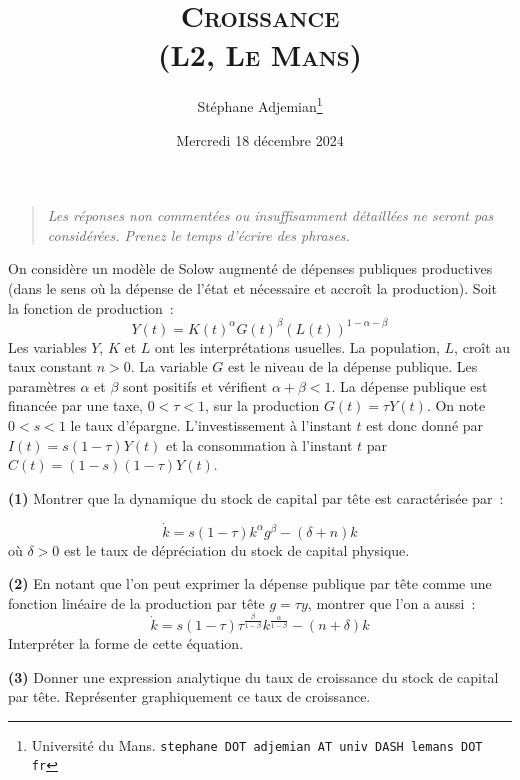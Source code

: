\documentclass[10pt,a4paper,notitlepage,twocolumn]{article}
\newcommand{\question}[1]{\textbf{(#1)}}
\begin{document}
\title{\textsc{Croissance\\ \small{(L2, Le Mans)}}}
\author{Stéphane Adjemian\thanks{Université du Mans. \texttt{stephane
DOT adjemian AT univ DASH lemans DOT fr}}}
\date{Mercredi 18 décembre 2024}

\maketitle

\thispagestyle{empty}

\begin{quote}
  \textit{Les réponses non commentées ou insuffisamment détaillées ne
  seront pas considérées. Prenez le temps d'écrire des phrases.}
\end{quote}

\bigskip
\bigskip

On considère un modèle de Solow augmenté de dépenses publiques
productives (dans le sens où la dépense de l'état et nécessaire et
accroît la production). Soit la fonction de production~:
\[
Y(t) = K(t)^{\alpha}G(t)^{\beta}(L(t))^{1-\alpha-\beta}
\]
Les variables $Y$, $K$ et $L$ ont les interprétations usuelles. La
population, $L$, croît au taux constant $n>0$. La variable $G$ est le
niveau de la dépense publique.  Les paramètres $\alpha$ et $\beta$
sont positifs et vérifient $\alpha+\beta<1$. La dépense publique est
financée par une taxe, $0<\tau<1$, sur la
production $G(t) = \tau Y(t)$. On note $0<s<1$ le taux
d'épargne. L'investissement à l'instant $t$ est donc donné
par $I(t) = s (1-\tau) Y(t)$ et la consommation à l'instant $t$
par $C(t) = (1-s)(1-\tau)Y(t)$.\newline

\question{1} Montrer que la dynamique du stock de capital par tête est caractérisée par~:

\[
\dot{k} = s(1-\tau)k^{\alpha}g^{\beta} - (\delta+n)k
\]
où $\delta>0$ est le taux de dépréciation du stock de capital physique.\newline

\question{2} En notant que l'on peut exprimer la dépense publique par
tête comme une fonction linéaire de la production par tête $g=\tau y$,
montrer que l'on a aussi~:
\[
\dot{k} = s(1-\tau)\tau^{\frac{\beta}{1-\beta}}k^{\frac{\alpha}{1-\beta}} - (n+\delta)k
\]
Interpréter la forme de cette équation.\newline

\question{3} Donner une expression analytique du taux de croissance du
stock de capital par tête. Représenter graphiquement ce taux de
croissance.\newline
\end{document}
